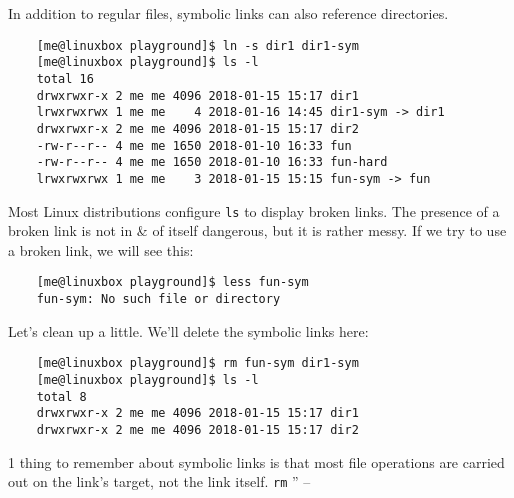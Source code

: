 \documentclass[oneside]{book}
\numberwithin{equation}{section}
\begin{document}
In addition to regular files, symbolic links can also reference directories.
\begin{verbatim}
	[me@linuxbox playground]$ ln -s dir1 dir1-sym
	[me@linuxbox playground]$ ls -l
	total 16
	drwxrwxr-x 2 me me 4096 2018-01-15 15:17 dir1
	lrwxrwxrwx 1 me me    4 2018-01-16 14:45 dir1-sym -> dir1
	drwxrwxr-x 2 me me 4096 2018-01-15 15:17 dir2
	-rw-r--r-- 4 me me 1650 2018-01-10 16:33 fun
	-rw-r--r-- 4 me me 1650 2018-01-10 16:33 fun-hard
	lrwxrwxrwx 1 me me    3 2018-01-15 15:15 fun-sym -> fun
\end{verbatim}
Most Linux distributions configure \texttt{ls} to display broken links. The presence of a broken link is not in \& of itself dangerous, but it is rather messy. If we try to use a broken link, we will see this:
\begin{verbatim}
	[me@linuxbox playground]$ less fun-sym
	fun-sym: No such file or directory
\end{verbatim}
Let's clean up a little. We'll delete the symbolic links here:
\begin{verbatim}
	[me@linuxbox playground]$ rm fun-sym dir1-sym
	[me@linuxbox playground]$ ls -l
	total 8
	drwxrwxr-x 2 me me 4096 2018-01-15 15:17 dir1
	drwxrwxr-x 2 me me 4096 2018-01-15 15:17 dir2
\end{verbatim}
1 thing to remember about symbolic links is that most file operations are carried out on the link's target, not the link itself. \texttt{rm} 
'' -- \cite[pp. 79--80]{Shotts2019}
\end{document}
